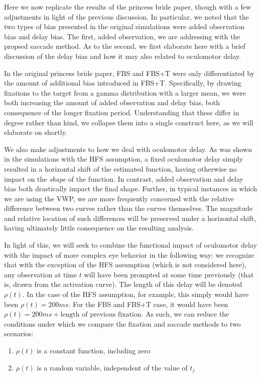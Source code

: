 \documentclass{article}
\begin{document}
Here we now replicate the results of the princess bride paper, though with a few adjustments in light of the previous discussion. In particular, we noted that the two types of bias presented in the original simulations were added observation bias and delay bias. The first, added observation, we are addressing with the propsed saccade method. As to the second, we first elaborate here with a brief discussion of the delay bias and how it may also related to oculomotor delay.

In the original princess bride paper, FBS and FBS+T were only differentiated by the amount of additional bias introduced in FBS+T. Specifically, by drawing fixations to the target from a gamma distribution with a larger mean, we were both increasing the amount of added observation and delay bias, both consequence of the longer fixation period. Understanding that these differ in degree rather than kind, we collapse them into a single construct here, as we will elaborate on shortly.

We also make adjustments to how we deal with oculomotor delay. As was shown in the simulations with the HFS assumption, a fixed oculomotor delay simply resulted in a horizontal shift of the estimated function, having otherwise no impact on the \textit{shape} of the function. In contrast, added observation and delay bias both drastically impact the final shape. Further, in typical instances in which we are using the VWP, we are more frequently concerned with the relative difference between two curves rather than the curves themselves. The magnitude and relative location of such differences will be preserved under a horizontal shift, having ultimately little consequence on the resulting analysis. 

In light of this, we will seek to combine the functional impact of oculomotor delay with the impact of more complex eye behavior in the following way: we recognize that with the exception of the HFS assumption (which is not considered here), any observation at time $t$ will have been prompted at some time previously (that is, drawn from the activation curve). The length of this delay will be denoted $\rho(t)$. In the case of the HFS assumption, for example, this simply would have been $\rho(t) = 200ms$. For the FBS and FBS+T case, it would have been $\rho(t) = 200ms + \text{length of previous fixation}$. As such, we can reduce the conditions under which we compare the fixation and saccade methods to two scenarios:

\begin{singlespace}
\begin{enumerate}
\item $\rho(t)$ is a constant function, including zero
\item $\rho(t)$ is a random variable, independent of the value of $t_j$
\end{enumerate}
\end{singlespace}
\end{document}
